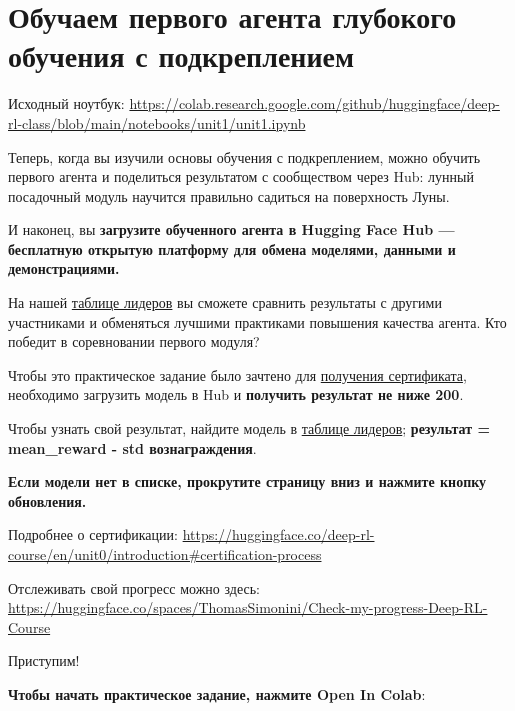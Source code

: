 \documentclass[11pt,a4paper]{article}
\begin{document}
\section{Обучаем первого агента глубокого обучения с подкреплением}\label{train-your-first-deep-reinforcement-learning-agent}

Исходный ноутбук: \url{https://colab.research.google.com/github/huggingface/deep-rl-class/blob/main/notebooks/unit1/unit1.ipynb}

Теперь, когда вы изучили основы обучения с подкреплением, можно обучить первого агента и поделиться результатом с сообществом через Hub: лунный посадочный модуль научится правильно садиться на поверхность Луны.


И наконец, вы \textbf{загрузите обученного агента в Hugging Face Hub --- бесплатную открытую платформу для обмена моделями, данными и демонстрациями.}

На нашей \href{https://huggingface.co/spaces/huggingface-projects/Deep-Reinforcement-Learning-Leaderboard}{таблице лидеров} вы сможете сравнить результаты с другими участниками и обменяться лучшими практиками повышения качества агента. Кто победит в соревновании первого модуля?

Чтобы это практическое задание было зачтено для \href{https://huggingface.co/deep-rl-course/en/unit0/introduction\#certification-process}{получения сертификата}, необходимо загрузить модель в Hub и \textbf{получить результат не ниже 200}.

Чтобы узнать свой результат, найдите модель в \href{https://huggingface.co/spaces/huggingface-projects/Deep-Reinforcement-Learning-Leaderboard}{таблице лидеров}; \textbf{результат = mean\_reward - std вознаграждения}.

\textbf{Если модели нет в списке, прокрутите страницу вниз и нажмите кнопку обновления.}

Подробнее о сертификации: \url{https://huggingface.co/deep-rl-course/en/unit0/introduction\#certification-process}

Отслеживать свой прогресс можно здесь: \url{https://huggingface.co/spaces/ThomasSimonini/Check-my-progress-Deep-RL-Course}

Приступим!

\textbf{Чтобы начать практическое задание, нажмите Open In Colab}:
\end{document}
